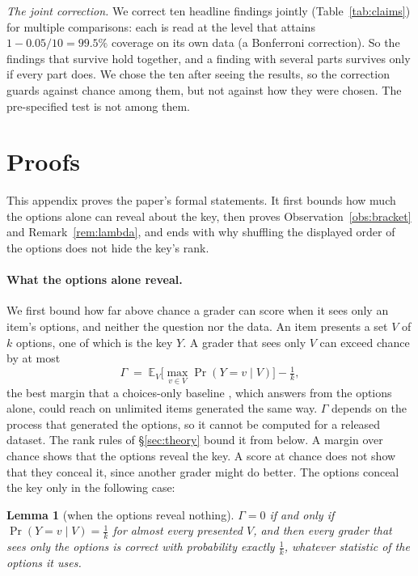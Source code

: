 \documentclass{article}
\newtheorem{lemma}{Lemma}
\begin{document}
\emph{The joint correction.} We correct ten headline findings jointly (Table~\ref{tab:claims}) for multiple
comparisons: each is read at the level that attains $1-0.05/10=99.5\%$ coverage on its own data (a Bonferroni
correction). So the findings that survive hold together, and a finding with several parts survives only if every
part does. We chose the ten after seeing the results, so the correction guards against chance among them, but not
against how they were chosen. The pre-specified test is not among them.

\FloatBarrier
\section{Proofs}
\label{app:theory}

This appendix proves the paper's formal statements. It first bounds how much the options alone can reveal about the
key, then proves Observation~\ref{obs:bracket} and Remark~\ref{rem:lambda}, and ends with why shuffling the displayed
order of the options does not hide the key's rank.

\paragraph{What the options alone reveal.} We first bound how far above chance a grader can score when it sees only an
item's options, and neither the question nor the data. An item presents a set $V$ of $k$ options, one of which is the
key $Y$. A grader that sees only $V$ can exceed chance by at most
\begin{equation}
\Gamma \;=\; \mathbb{E}_V\Big[\max_{v\in V}\Pr(Y=v\mid V)\Big]-\tfrac1k ,
\label{eq:gamma}
\end{equation}
the best margin that a choices-only baseline \citep{choicesonly}, which answers from the options alone, could reach
on unlimited items generated the same way. $\Gamma$ depends on the process that generated the options, so it cannot be
computed for a released dataset. The rank rules of \S\ref{sec:theory} bound it from below. A margin over chance
shows that the options reveal the key. A score at chance does not show that they conceal it, since another grader
might do better. The options conceal the key only in the following case:

\begin{lemma}[when the options reveal nothing]
\label{lem:flat}
$\Gamma=0$ if and only if $\Pr(Y=v\mid V)=\tfrac1k$ for almost every presented $V$, and then every grader
that sees only the options is correct with probability exactly $\tfrac1k$, whatever statistic of the options
it uses.
\end{lemma}
\end{document}
